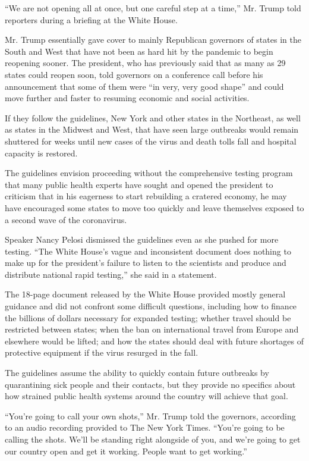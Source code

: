 ``We are not opening all at once, but one careful step at a time,'' Mr.
Trump told reporters during a briefing at the White House.

Mr. Trump essentially gave cover to mainly Republican governors of
states in the South and West that have not been as hard hit by the
pandemic to begin reopening sooner. The president, who has previously
said that as many as 29 states could reopen soon, told governors on a
conference call before his announcement that some of them were ``in
very, very good shape'' and could move further and faster to resuming
economic and social activities.

If they follow the guidelines, New York and other states in the
Northeast, as well as states in the Midwest and West, that have seen
large outbreaks would remain shuttered for weeks until new cases of the
virus and death tolls fall and hospital capacity is restored.

The guidelines envision proceeding without the comprehensive testing
program that many public health experts have sought and opened the
president to criticism that in his eagerness to start rebuilding a
cratered economy, he may have encouraged some states to move too quickly
and leave themselves exposed to a second wave of the coronavirus.

Speaker Nancy Pelosi dismissed the guidelines even as she pushed for
more testing. ``The White House's vague and inconsistent document does
nothing to make up for the president's failure to listen to the
scientists and produce and distribute national rapid testing,'' she said
in a statement.

The 18-page document released by the White House provided mostly general
guidance and did not confront some difficult questions, including how to
finance the billions of dollars necessary for expanded testing; whether
travel should be restricted between states; when the ban on
international travel from Europe and elsewhere would be lifted; and how
the states should deal with future shortages of protective equipment if
the virus resurged in the fall.

The guidelines assume the ability to quickly contain future outbreaks by
quarantining sick people and their contacts, but they provide no
specifics about how strained public health systems around the country
will achieve that goal.

``You're going to call your own shots,'' Mr. Trump told the governors,
according to an audio recording provided to The New York Times. ``You're
going to be calling the shots. We'll be standing right alongside of you,
and we're going to get our country open and get it working. People want
to get working.''

